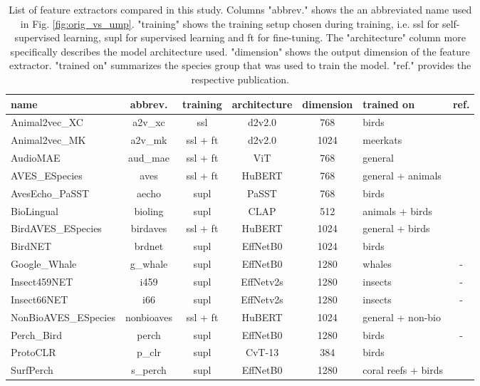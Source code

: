 
\begin{table*}[t]
  
  \caption{List of feature extractors compared in this study. Columns "abbrev." shows the an abbreviated name used in Fig. \ref{fig:orig_vs_ump}. "training" shows the training setup chosen during training, i.e. ssl for self-supervised learning, supl for supervised learning and ft for fine-tuning. The "architecture" column more specifically describes the model architecture used. "dimension" shows the output dimension of the feature extractor. "trained on" summarizes the species group that was used to train the model. "ref." provides the respective publication.}
  \label{tab:bacpipe_models}

  \centering
  \begin{tabular}{l|c|c|c|c|l|c}
     \hline
    name& abbrev. & 
    training & architecture &
    dimension & trained on & ref.\\
    \hline
    Animal2vec\_XC      & a2v\_xc   & ssl & d2v2.0 & 768 & birds & \cite{schafer-zimmermann_animal2vec_2024}\\
    Animal2vec\_MK      & a2v\_mk  & ssl + ft & d2v2.0 & 1024& meerkats & \cite{schafer-zimmermann_animal2vec_2024}\\
    AudioMAE            & aud\_mae  & ssl + ft & ViT 	 & 768 & general & \cite{huang_masked_2022}\\
    AVES\_ESpecies      & aves   & ssl + ft & HuBERT 	 & 768 & general + animals & \cite{hagiwara_aves_2022}\\
    AvesEcho\_PaSST     & aecho   & supl & PaSST 	 & 768 & birds & \cite{ghani_generalization_2024}\\
    BioLingual          & bioling  & supl & CLAP 	 & 512 & animals + birds & \cite{robinson_transferable_2023}\\
    BirdAVES\_ESpecies  & birdaves   & ssl + ft & HuBERT 	 & 1024& general + birds & \cite{hagiwara_aves_2022}\\
    BirdNET             & brdnet   & supl & EffNetB0 	 & 1024& birds & \cite{kahl_birdnet_2021}\\
    Google\_Whale       &  g\_whale  & supl & EffNetB0 	 & 1280& whales & - \\
    Insect459NET        & i459 & supl & EffNetv2s 	 & 1280& insects & - \\
    Insect66NET         & i66 & supl & EffNetv2s 	 & 1280& insects & - \\
    NonBioAVES\_ESpecies& nonbioaves    & ssl + ft & HuBERT 	 & 1024& general + non-bio & \cite{hagiwara_aves_2022}\\
    Perch\_Bird         & perch    & supl & EffNetB0 	 & 1280& birds & - \\
    ProtoCLR            & p\_clr   & supl 	 & CvT-13 & 384 & birds & \cite{moummad_domain-invariant_2024}\\
    SurfPerch           &  s\_perch  & supl & EffNetB0 	 & 1280& coral reefs + birds & \cite{williams_leveraging_2024}\\
  \end{tabular}
\end{table*}

